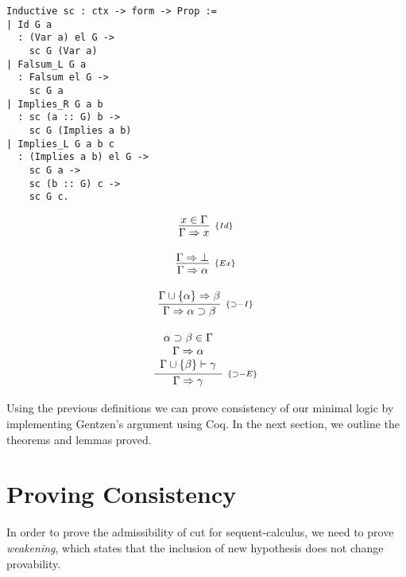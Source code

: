 \documentclass[12pt]{article}
\theoremstyle{definition}
\begin{document}
\begin{minipage}[c]{0.6\textwidth}
\begin{lstlisting}
Inductive sc : ctx -> form -> Prop :=
| Id G a
  : (Var a) el G ->
    sc G (Var a)
| Falsum_L G a
  : Falsum el G ->
    sc G a
| Implies_R G a b
  : sc (a :: G) b ->
    sc G (Implies a b)
| Implies_L G a b c
  : (Implies a b) el G ->
    sc G a ->
    sc (b :: G) c ->
    sc G c.  
\end{lstlisting}
\end{minipage}
\begin{minipage}[c]{0.3\textwidth}
\[
\begin{array}{c}
\infer[_{\{Id\}}]{\Gamma \Rightarrow x}{x \in \Gamma} \\ \\
\infer[_{\{Ex\}}]{\Gamma \Rightarrow \alpha}{\Gamma \Rightarrow \bot}\\ \\
\infer[_{\{\supset-I\}}]{\Gamma \Rightarrow \alpha \supset \beta}{\Gamma \cup \{\alpha\} \Rightarrow \beta}\\ \\
  \infer[_{\{\supset-E\}}]{\Gamma \Rightarrow \gamma}{\begin{array}{c}
                                                       \alpha \supset \beta \in
                                                        \Gamma \\
                                                        \Gamma \Rightarrow
                                                        \alpha \\ \Gamma \cup
                                                        \{\beta\}\vdash \gamma
                                                    \end{array}}
\end{array}
\]
\end{minipage}

Using the previous definitions we can prove consistency of our minimal logic by
implementing Gentzen's argument using Coq. In the next section, we outline the
theorems and lemmas proved.

\section{Proving Consistency}

In order to prove the admissibility of cut for sequent-calculus, we need to
prove \emph{weakening}, which states that the inclusion of new hypothesis does
not change provability.
\end{document}
